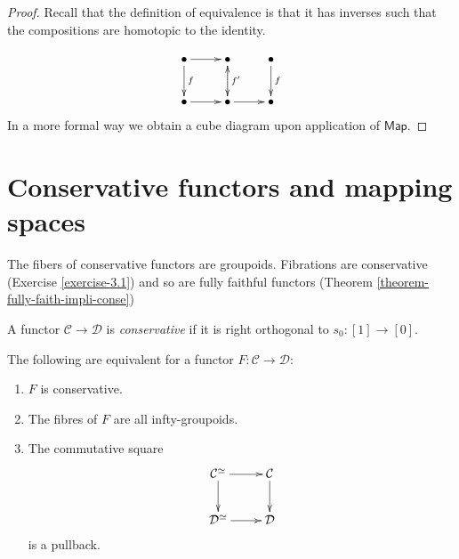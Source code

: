 \begin{proof}
Recall that the definition of
equivalence is that it has inverses such
that the compositions are homotopic to the
identity.

$$
\xymatrix{
\bullet\ar[r]\ar[d]^f&\bullet\ar[d]^{f'}&
\bullet\ar[d]^{f}\\
\bullet\ar[r]&\bullet\ar@{.>}[u]\ar[r]&
\bullet
}
$$
In a more formal way we obtain a cube diagram
upon application of $\mathsf{Map}$.
\end{proof}


\section{Conservative functors and mapping
spaces}
\label{section-conse-funct-mappi-space}

\noindent
The fibers of conservative functors are
groupoids.
Fibrations are conservative (Exercise
\ref{exercise-3.1})
and so are fully faithful functors (Theorem
\ref{theorem-fully-faith-impli-conse})

\begin{definition}
\label{definition-conservative-functor}
A functor $\mathcal{C} \to \mathcal{D}$ is
{\it conservative}
if it is right orthogonal to $s_0:[1]\to
[0]$.
\end{definition}

\begin{exercise}
\label{exercise-equiv-conse-funct}
The following are equivalent for a functor
$F:\mathcal{C} \to \mathcal{D}$:
\begin{enumerate}
\item $F$ is conservative.
\label{item-conservative1}

\item The fibres of $F$ are all
infty-groupoids.
\label{item-conservative2}

\item The commutative square
\label{item-conservative3}
$$
\xymatrix{
\mathcal{C}^{\simeq}\ar[r]\ar[d]&\mathcal{C}
\ar[d]\\
\mathcal{D}^{\simeq}\ar[r]&\mathcal{D}
}
$$
is a pullback.
\end{enumerate}
\end{exercise}

